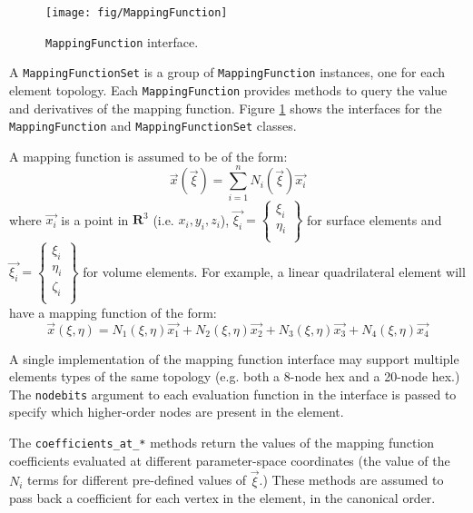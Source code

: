 \documentclass{article}
\begin{document}
\begin{figure}[htb]
\begin{center}
\texttt{[image: fig/MappingFunction]}
\caption{\texttt{MappingFunction} interface.\label{fig:MappingFunction}}
\end{center}
\end{figure}

A \texttt{MappingFunctionSet} is a group of \texttt{MappingFunction} instances, one for each element topology.  Each \texttt{MappingFunction} provides methods to query the value and derivatives of the mapping function.  Figure \ref{fig:MappingFunction} shows the interfaces for the \texttt{MappingFunction} and \texttt{MappingFunctionSet} classes.

A mapping function is assumed to be of the form:
\begin{displaymath}
\vec{x}(\vec{\xi})=\sum_{i=1}^n N_i(\vec{\xi})\vec{x_i}
\end{displaymath}
where $\vec{x_i}$ is a point in $\mathbf{R}^3$ (i.e. $x_i,y_i,z_i$), $\vec{\xi_i} = \left\{\begin{array}{c}\xi_i\\ \eta_i\\ \end{array}\right\}$ for surface elements and $\vec{\xi_i} = \left\{\begin{array}{c}\xi_i\\ \eta_i\\ \zeta_i\\ \end{array}\right\}$ for volume elements.  For example,  a linear quadrilateral element will have a mapping function of the form:
\begin{displaymath}
\vec{x}(\xi,\eta)=N_1(\xi,\eta)\vec{x_1}
                      +N_2(\xi,\eta)\vec{x_2}
                      +N_3(\xi,\eta)\vec{x_3}
                      +N_4(\xi,\eta)\vec{x_4}
\end{displaymath}

A single implementation of the mapping function interface may support multiple elements types of the same topology (e.g. both a 8-node hex and a 20-node hex.)  The \texttt{nodebits} argument to each evaluation function in the interface is passed to specify which higher-order nodes are present in the element.

The \texttt{coefficients\_at\_*} methods return the values of the mapping function coefficients evaluated at different parameter-space coordinates (the value of the $N_i$ terms for different pre-defined values of $\vec{\xi}$.)  These methods are assumed to pass back a coefficient for each vertex in the element, in the canonical order.
\end{document}
